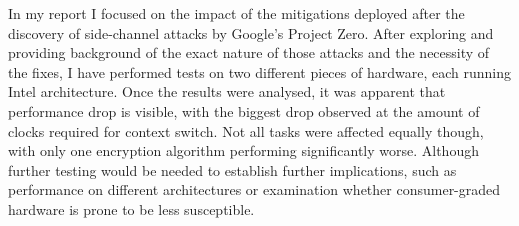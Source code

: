 \documentclass{csfourzero}
\begin{document}
In my report I focused on the impact of the mitigations deployed after the discovery of side-channel attacks by Google's Project Zero. After exploring and providing background of the exact nature of those attacks and the necessity of the fixes, I have performed tests on two different pieces of hardware, each running Intel architecture. Once the results were analysed, it was apparent that performance drop is visible, with the biggest drop observed at the amount of clocks required for context switch. Not all tasks were affected equally though, with only one encryption algorithm performing significantly worse. Although further testing would be needed to establish further implications, such as performance on different architectures or examination whether consumer-graded hardware is prone to be less susceptible. 


\end{document}
